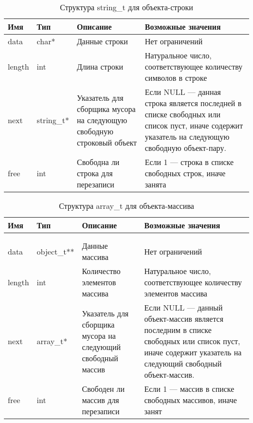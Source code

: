 \begin{xltabular}{\textwidth}{|l|l|p{5.7cm}|X|}
	\caption{Структура string\_t для объекта-строки\label{strobjstr:table}}\\ \hline
	\centrow Имя & \centrow Тип & \centrow Описание & \centrow Возможные значения \\ \hline
	\finishhead
	data & char* & Данные строки & Нет ограничений \\ \hline 
	length & int & Длина строки & Натуральное число, соответствующее количеству символов в строке \\ \hline 
	next & string\_t* & Указатель для сборщика мусора на следующую свободную строковый объект & Если NULL — данная строка является последней в списке свободных или список пуст, иначе содержит указатель на следующую свободную объект-пару. \\ \hline 
	free & int & Свободна ли строка для перезаписи & Если 1 — строка в списке свободных строк, иначе занята
\end{xltabular}


\begin{xltabular}{\textwidth}{|l|l|p{5.7cm}|X|}
	\caption{Структура array\_t для объекта-массива\label{strobjarr:table}}\\ \hline
	\centrow Имя & \centrow Тип & \centrow Описание & \centrow Возможные значения \\ \hline
	 &  &  &  \\ \hline
	\endfirsthead
	 &  &  &  \\ \hline
	\finishhead
	data & object\_t** & Данные массива & Нет ограничений \\ \hline 
	length & int & Количество элементов массива & Натуральное число, соответствующее количеству элементов массива \\ \hline 
	next & array\_t* & Указатель для сборщика мусора на следующий свободный массив & Если NULL — данный объект-массив является последним в списке свободных или список пуст, иначе содержит указатель на следующий свободный объект-массив. \\ \hline 
	free & int & Свободен ли массив для перезаписи & Если 1 — массив в списке свободных массивов, иначе занят
\end{xltabular}

